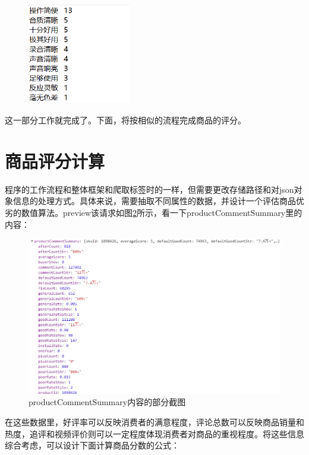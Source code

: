 \begin{figure}[htbp]
\centering
\includegraphics[width=4.5cm]{img/yhb/contents_eg_jd.png}
\label{img:yhb9}   %
\end{figure}

这一部分工作就完成了。下面，将按相似的流程完成商品的评分。



\section{商品评分计算}
程序的工作流程和整体框架和爬取标签时的一样，但需要更改存储路径和对json对象信息的处理方式。具体来说，需要抽取不同属性的数据，并设计一个评估商品优劣的数值算法。preview该请求如图\ref{img:yhb10}所示，看一下productCommentSummary里的内容：

\begin{figure}[htbp]
\centering
\includegraphics[width=13.5cm]{img/yhb/data_eg_jd.png}
\caption{productCommentSummary内容的部分截图}
\label{img:yhb10}  %
\end{figure}

在这些数据里，好评率可以反映消费者的满意程度，评论总数可以反映商品销量和热度，追评和视频评价则可以一定程度体现消费者对商品的重视程度。将这些信息综合考虑，可以设计下面计算商品分数的公式：

